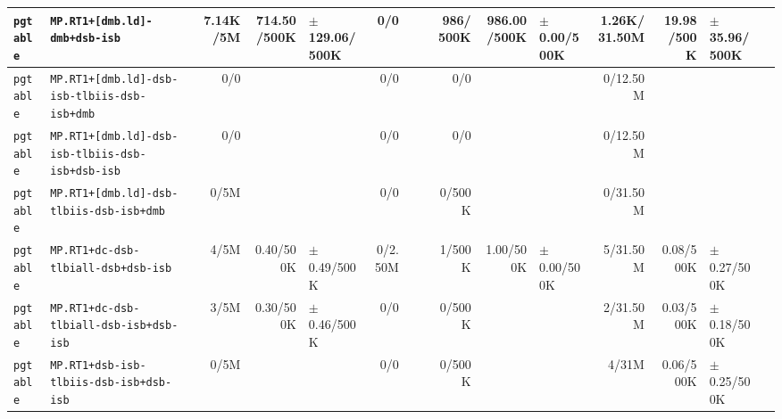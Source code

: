 \begin{tabular}{l l  | r r l | r r l | r r l | r r l l}
     \verb|pgtable| &                         \verb|MP.RT1+[dmb.ld]-dmb+dsb-isb| &       7.14K/5M &           714.50/500K & $\pm$ 129.06/500K &            0/0 &                       &                 &       986/500K &           986.00/500K &   $\pm$ 0.00/500K &   1.26K/31.50M &            19.98/500K &  $\pm$ 35.96/500K & \\ \hline 
     \verb|pgtable| &          \verb|MP.RT1+[dmb.ld]-dsb-isb-tlbiis-dsb-isb+dmb| &            0/0 &                       &                   &            0/0 &                       &                 &            0/0 &                       &                   &       0/12.50M &                       &                   & \\ \hline 
     \verb|pgtable| &      \verb|MP.RT1+[dmb.ld]-dsb-isb-tlbiis-dsb-isb+dsb-isb| &            0/0 &                       &                   &            0/0 &                       &                 &            0/0 &                       &                   &       0/12.50M &                       &                   & \\ \hline 
     \verb|pgtable| &              \verb|MP.RT1+[dmb.ld]-dsb-tlbiis-dsb-isb+dmb| &           0/5M &                       &                   &            0/0 &                       &                 &         0/500K &                       &                   &       0/31.50M &                       &                   & \\ \hline 
     \verb|pgtable| &                   \verb|MP.RT1+dc-dsb-tlbiall-dsb+dsb-isb| &           4/5M &             0.40/500K &   $\pm$ 0.49/500K &        0/2.50M &                       &                 &         1/500K &             1.00/500K &   $\pm$ 0.00/500K &       5/31.50M &             0.08/500K &   $\pm$ 0.27/500K & \\ \hline 
     \verb|pgtable| &               \verb|MP.RT1+dc-dsb-tlbiall-dsb-isb+dsb-isb| &           3/5M &             0.30/500K &   $\pm$ 0.46/500K &            0/0 &                       &                 &         0/500K &                       &                   &       2/31.50M &             0.03/500K &   $\pm$ 0.18/500K & \\ \hline 
     \verb|pgtable| &               \verb|MP.RT1+dsb-isb-tlbiis-dsb-isb+dsb-isb| &           0/5M &                       &                   &            0/0 &                       &                 &         0/500K &                       &                   &          4/31M &             0.06/500K &   $\pm$ 0.25/500K & \\ \hline 

\end{tabular}
